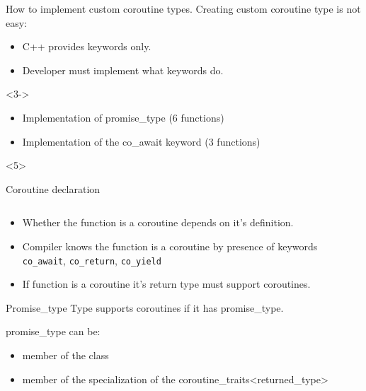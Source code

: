 \documentclass[10pt]{beamer}
\begin{document}
\begin{frame}{How to implement custom coroutine types.}
	Creating custom coroutine type is not easy:
	\begin{itemize}[<+->]
		\item C++ provides keywords \alert{only}.
		\item \alert{Developer must implement} what keywords do.
	\end{itemize}

	\vfill

	<3->
	\begin{itemize}[<+->]
		\item Implementation of promise\_type ({\selectfont\texttildelow}6 functions)
		\item Implementation of the co\_await  keyword ({\selectfont\texttildelow}3 functions)
	\end{itemize}

	\vfill

\end{frame}

\begin{frame}{Coroutine declaration}
  \vfill
  \begin{center}
  \begin{minipage}{0.8\linewidth}
  \inputminted{c++}{code-examples/intro/declaration.hpp}
  \end{minipage}
  \end{center}
  \vfill

  \begin{itemize}[<+->]
  	\item Whether the function is a coroutine depends on \alert{it's definition}.
  	\item Compiler knows the function is a coroutine by presence of keywords {\alert{\texttt{co\_await}}, \alert{\texttt{co\_return}}, \alert{\texttt{co\_yield}}}
  	\item If function is a coroutine it's \alert{return type must support coroutines}.
  \end{itemize}
  
\end{frame}

\begin{frame}{Promise\_type}
	Type supports coroutines \alert{if it has promise\_type}.
	\vfill

	promise\_type can be:
	\begin{itemize}[<+-|alert@+>]
		\item member of the class
		\item member of the specialization of the coroutine\_traits<returned\_type>
	\end{itemize}
\end{frame}
\end{document}
